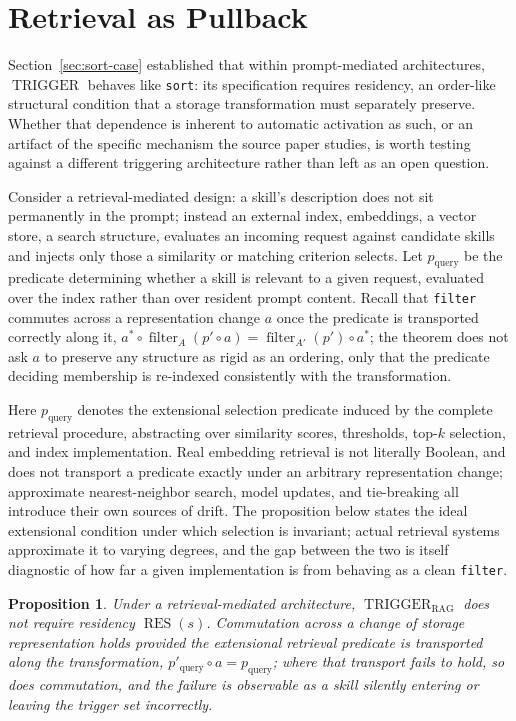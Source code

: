 \documentclass[11pt]{article}
\newtheorem{proposition}{Proposition}
\begin{document}
\section{Retrieval as Pullback}
\label{sec:retrieval}

Section~\ref{sec:sort-case} established that within prompt-mediated architectures, $\operatorname{TRIGGER}$ behaves like \texttt{sort}: its specification requires residency, an order-like structural condition that a storage transformation must separately preserve. Whether that dependence is inherent to automatic activation as such, or an artifact of the specific mechanism the source paper studies, is worth testing against a different triggering architecture rather than left as an open question.

Consider a retrieval-mediated design: a skill's description does not sit permanently in the prompt; instead an external index, embeddings, a vector store, a search structure, evaluates an incoming request against candidate skills and injects only those a similarity or matching criterion selects. Let $p_{\text{query}}$ be the predicate determining whether a skill is relevant to a given request, evaluated over the index rather than over resident prompt content. Recall that \texttt{filter} commutes across a representation change $a$ once the predicate is transported correctly along it, $a^* \circ \operatorname{filter}_A(p' \circ a) = \operatorname{filter}_{A'}(p') \circ a^*$; the theorem does not ask $a$ to preserve any structure as rigid as an ordering, only that the predicate deciding membership is re-indexed consistently with the transformation.

Here $p_{\text{query}}$ denotes the extensional selection predicate induced by the complete retrieval procedure, abstracting over similarity scores, thresholds, top-$k$ selection, and index implementation. Real embedding retrieval is not literally Boolean, and does not transport a predicate exactly under an arbitrary representation change; approximate nearest-neighbor search, model updates, and tie-breaking all introduce their own sources of drift. The proposition below states the ideal extensional condition under which selection is invariant; actual retrieval systems approximate it to varying degrees, and the gap between the two is itself diagnostic of how far a given implementation is from behaving as a clean \texttt{filter}.

\begin{proposition}
Under a retrieval-mediated architecture, $\operatorname{TRIGGER}_{\text{RAG}}$ does not require residency $\operatorname{RES}(s)$. Commutation across a change of storage representation holds provided the extensional retrieval predicate is transported along the transformation, $p'_{\text{query}} \circ a = p_{\text{query}}$; where that transport fails to hold, so does commutation, and the failure is observable as a skill silently entering or leaving the trigger set incorrectly.
\end{proposition}
\end{document}
